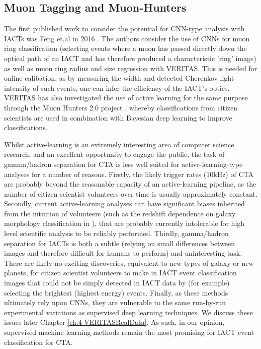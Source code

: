 \subsection{Muon Tagging and Muon-Hunters}
The first published work to consider the potential for CNN-type analysis with IACTs was Feng et.al in 2016 \cite{feng2016}. The authors consider the use of CNNs for muon ring classification (selecting events where a muon has passed directly down the optical path of an IACT and has therefore produced a characteristic 'ring' image) as well as muon ring radius and size regression with VERITAS. This is needed for online calibation, as by measuring the width and detected Cherenkov light intensity of such events, one can infer the efficiency of the IACT's optics. VERITAS has also investigated the use of active learning for the same purpose through the Muon Hunters 2.0 project \cite{muonhunters2}, whereby classifications from citizen scientists are used in combination with Bayesian deep learning to improve classifications.

Whilst active-learning is an extremely interesting area of computer science research, and an excellent opportunity to engage the public, the task of gamma/hadron separation for CTA is less well suited for active-learning-type analyses for a number of reasons. Firstly, the likely trigger rates (10kHz) \cite{trigrate} of CTA are probably beyond the reasonable capacity of an active-learning pipeline, as the number of citizen scientist volunteers over time is usually approximately constant. Secondly, current active-learning analyses can have significant biases inherited from the intuition of volunteers (such as the redshift dependence on galaxy morphology classification in \cite{mike}), that are probably currently intolerable for high level scientific analysis to be reliably performed. Thirdly, gamma/hadron separation for IACTs is both a subtle (relying on small differences between images and therefore difficult for humans to perform) and uninteresting task. There are likely no exciting discoveries, equivalent to new types of galaxy or new planets, for citizen scientist volunteers to make in IACT event classification images that could not be simply detected in IACT data by (for example) selecting the brightest (highest energy) events. Finally, as these methods ultimately rely upon CNNs, they are vulnerable to the same run-by-run experimental variations as supervised deep learning techniques. We discuss these issues later Chapter \ref{ch:4-VERITASRealData}. As such, in our opinion, supervised machine learning methods remain the most promising for IACT event classification for CTA.

